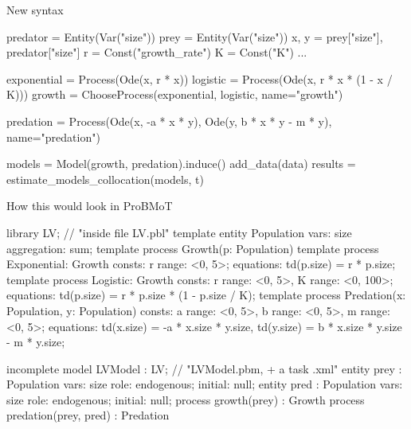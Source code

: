 \documentclass[14pt,aspectratio=169]{beamer}
\begin{document}
 \begin{frame}[fragile]{New syntax}
    \begin{code}[python][\scriptsize]
predator = Entity(Var("size"))
prey = Entity(Var("size"))
x, y = prey["size"], predator["size"]
r = Const("growth_rate")
K = Const("K")
...

exponential = Process(Ode(x, r * x))
logistic = Process(Ode(x, r * x * (1 - x / K)))
growth = ChooseProcess(exponential, logistic, name="growth")

predation = Process(Ode(x, -a * x * y), Ode(y, b * x * y - m * y),
                    name="predation")

models = Model(growth, predation).induce()  
add_data(data)
results = estimate_models_collocation(models, t)
    \end{code}
\end{frame}
 \begin{frame}[fragile]{How this would look in ProBMoT}
    \begin{code}[text][\scriptsize]
library LV;  // "inside file LV.pbl"
template entity Population { vars: size {aggregation: sum}; }
template process Growth(p: Population) {}
template process Exponential: Growth {
  consts: r {range: <0, 5>};
  equations: td(p.size) = r * p.size; }
template process Logistic: Growth {
  consts: r {range: <0, 5>}, K {range: <0, 100>};
  equations: td(p.size) = r * p.size * (1 - p.size / K); }
template process Predation(x: Population, y: Population) {
  consts: a {range: <0, 5>}, b {range: <0, 5>}, m {range: <0, 5>};
  equations: td(x.size) = -a * x.size * y.size,
             td(y.size) = b * x.size * y.size - m * y.size; }
    \end{code}
    \begin{code}[text][\scriptsize]
incomplete model LVModel : LV;  // "LVModel.pbm, + a task .xml"
entity prey : Population { vars: size {role: endogenous; initial: null}; }
entity pred : Population { vars: size {role: endogenous; initial: null}; }
process growth(prey) : Growth {}
process predation(prey, pred) : Predation {}
    \end{code}
\end{frame}
\end{document}
